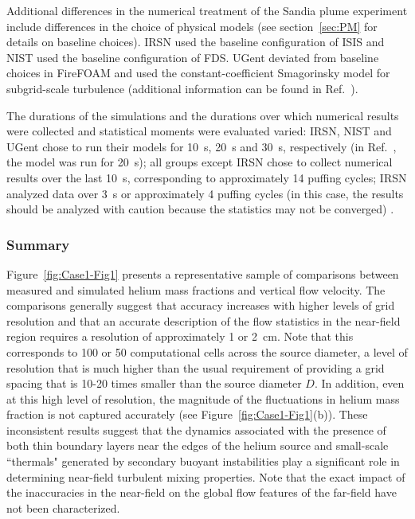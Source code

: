 Additional differences in the numerical treatment of the Sandia plume experiment include differences in the choice of physical models (see section~\ref{sec:PM} for details on baseline choices).  IRSN used the baseline configuration of ISIS and NIST used the baseline configuration of FDS. UGent deviated from baseline choices in FireFOAM and used the constant-coefficient Smagorinsky model for subgrid-scale turbulence (additional information can be found in Ref.~\cite{Maragkos:2013}). 

The durations of the simulations and the durations over which numerical results were collected and statistical moments were evaluated varied: IRSN, NIST and UGent chose to run their models for 10~s, 20~s and 30~s, respectively (in Ref.~\cite{DesJardin:2004}, the model was run for 20~s); all groups except IRSN chose to collect numerical results over the last 10~s, corresponding to approximately 14 puffing cycles; IRSN analyzed data over 3~s or approximately 4 puffing cycles (in this case, the results should be analyzed with caution because the statistics may not be converged) .

\subsubsection{Summary}

Figure~\ref{fig:Case1-Fig1} presents a representative sample of comparisons between measured and simulated helium mass fractions and vertical flow velocity. The comparisons generally suggest that accuracy increases with higher levels of grid resolution and that an accurate description of the flow statistics in the near-field region requires a resolution of approximately 1 or 2~cm. Note that this corresponds to 100 or 50 computational cells across the source diameter, a level of resolution that is much higher than the usual requirement of providing a grid spacing that is 10-20 times smaller than the source diameter $D$. In addition, even at this high level of resolution, the magnitude of the fluctuations in helium mass fraction is not captured accurately (see Figure~\ref{fig:Case1-Fig1}(b)). These inconsistent results suggest that the dynamics associated with the presence of both thin boundary layers near the edges of the helium source and small-scale ``thermals" generated by secondary buoyant instabilities play a significant role in determining near-field turbulent mixing properties. Note that the exact impact of the inaccuracies in the near-field on the global flow features of the far-field have not been characterized.

